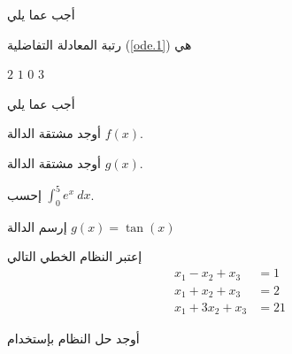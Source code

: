 \documentclass[addpoints,12pt]{exam}
\renewcommand{\eqref}[1]{(\textup{{\ref{#1}}})}
\begin{document}
\fontsize{14pt}{14pt}\selectfont

أجب عما يلي

\begin{questions}

\question {} رتبة المعادلة التفاضلية  \eqref{ode.1} هي

\begin{oneparchoices}
\choice $2$
\choice $1$
\choice $0$
\CorrectChoice $3$
\end{oneparchoices}
\question[4] أجب عما يلي
\begin{parts}
\item أوجد مشتقة الدالة $f(x)$.
\fillwithdottedlines{1in}
\item أوجد مشتقة الدالة $g(x)$.
\fillwithdottedlines{1in}
\end{parts}

\question[6]
إحسب $\displaystyle \int_0^5 e^{x}\: dx$.
\fillwithdottedlines{1.6in}

\question[5]
إرسم الدالة $g(x)= \tan(x)$\\
\fillwithdottedlines{1.8in}

\question
إعتبر النظام الخطي التالي
\begin{align*}
\nonumber   x_1 - x_2 + x_3 &= 1 \\
\nonumber  x_1 + x_2 + x_3&= 2 \\
\nonumber  x_1 + 3x_2 + x_3 &= 21
\end{align*}

أوجد حل النظام بإستخدام


\end{questions}

\begin{center}
\end{center}
\end{document}
